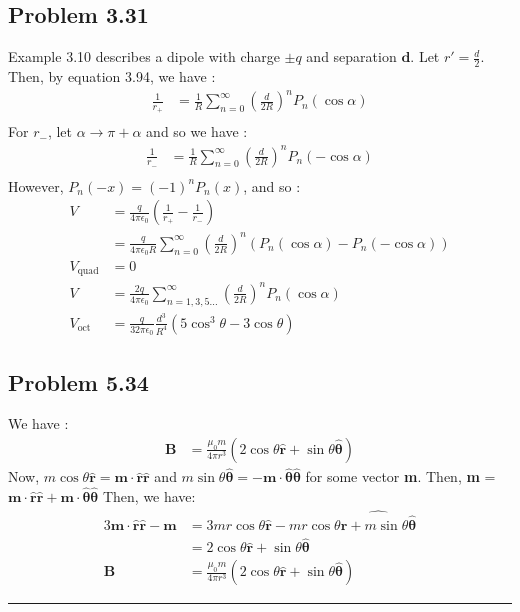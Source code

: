 \documentclass{article}
\begin{document}
\bigskip

\subsection*{Problem 3.31}
Example 3.10 describes a dipole with charge $\pm q$ and separation $\textbf{d}$. Let $r' = \frac{d}{2}$. Then, by equation 3.94, we have :
\begin{align*}
    \frac{1}{r_+} &= \frac{1}{R}\sum_{n=0}^{\infty}\left(\frac{d}{2R} \right)^n P_n (\cos\alpha)\\
\end{align*}
For $r_-$, let $\alpha \longrightarrow \pi + \alpha$ and so we have :
\begin{align*}
    \frac{1}{r_-} &= \frac{1}{R}\sum_{n=0}^{\infty}\left(\frac{d}{2R} \right)^n P_n (-\cos\alpha)\\
\end{align*}
However, $P_n(-x) = (-1)^nP_n(x)$, and so :
\begin{align*}
    V &= \frac{q}{4\pi\epsilon_0}\left(\frac{1}{r_+} - \frac{1}{r_-} \right) \\
    &= \frac{q}{4\pi\epsilon_0R}\sum_{n=0}^{\infty}\left(\frac{d}{2R} \right)^n (P_n (\cos\alpha) - P_n(-\cos\alpha)) \\
    V_{\text{quad}} &= 0 \\
    V &= \frac{2q}{4\pi\epsilon_0}\sum_{n=1,3,5...}^{\infty}\left(\frac{d}{2R} \right)^n P_n (\cos\alpha)\\
    V_{\text{oct}} &= \frac{q}{32\pi\epsilon_0}\frac{d^3}{R^4}(5\cos^3\theta - 3\cos\theta)
\end{align*}

\bigskip

\subsection*{Problem 5.34}
We have :
\begin{align*}
    \textbf{B} &= \frac{\mu_0m}{4\pi r^3}(2\cos\theta \hat{\textbf{r}} + \sin\theta \hat{\boldsymbol{\theta}})
\end{align*}
Now, $m\cos\theta\hat{\textbf{r}} = \textbf{m}\cdot\hat{\textbf{r}}\hat{\textbf{r}}$ and $m\sin\theta\hat{\boldsymbol{\theta}} = -\textbf{m}\cdot\hat{\boldsymbol{\theta}}\hat{\boldsymbol{\theta}}$ for some vector \textbf{m}. Then, \textbf{m} = $\textbf{m}\cdot\hat{\textbf{r}}\hat{\textbf{r}} + \textbf{m}\cdot\hat{\boldsymbol{\theta}}\hat{\boldsymbol{\theta}}$  Then, we have:
\begin{align*}
    3\textbf{m}\cdot\hat{\textbf{r}}\hat{\textbf{r}} - \textbf{m}
 &= 3mr\cos\theta\hat{\textbf{r}}  - mr\cos\theta\hat{\textbf{r} + m\sin\theta\hat{\boldsymbol{\theta}}}\\
 &= 2\cos\theta \hat{\textbf{r}} + \sin\theta \hat{\boldsymbol{\theta}}\\
 \textbf{B} &= \frac{\mu_0m}{4\pi r^3}(2\cos\theta \hat{\textbf{r}} + \sin\theta \hat{\boldsymbol{\theta}})
\end{align*}

\bigskip

\hrule
\end{document}

